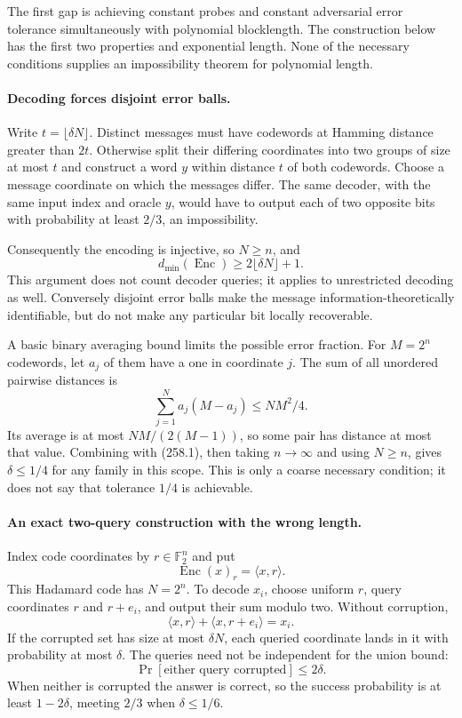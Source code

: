 \documentclass[11pt]{article}
\begin{document}
The first gap is achieving constant probes and constant adversarial error tolerance simultaneously with polynomial blocklength. The construction below has the first two properties and exponential length. None of the necessary conditions supplies an impossibility theorem for polynomial length.

\paragraph{Decoding forces disjoint error balls.}
Write $t=\lfloor\delta N\rfloor$. Distinct messages must have codewords at Hamming distance greater than $2t$. Otherwise split their differing coordinates into two groups of size at most $t$ and construct a word $y$ within distance $t$ of both codewords. Choose a message coordinate on which the messages differ. The same decoder, with the same input index and oracle $y$, would have to output each of two opposite bits with probability at least $2/3$, an impossibility.

Consequently the encoding is injective, so $N\ge n$, and
\[
 d_{\min}(\operatorname{Enc})\ge2\lfloor\delta N\rfloor+1.
 \tag{258.1}
\]
This argument does not count decoder queries; it applies to unrestricted decoding as well. Conversely disjoint error balls make the message information-theoretically identifiable, but do not make any particular bit locally recoverable.

A basic binary averaging bound limits the possible error fraction. For $M=2^n$ codewords, let $a_j$ of them have a one in coordinate $j$. The sum of all unordered pairwise distances is
\[
 \sum_{j=1}^N a_j(M-a_j)\le NM^2/4.
\]
Its average is at most $NM/(2(M-1))$, so some pair has distance at most that value. Combining with (258.1), then taking $n\to\infty$ and using $N\ge n$, gives $\delta\le1/4$ for any family in this scope. This is only a coarse necessary condition; it does not say that tolerance $1/4$ is achievable.

\paragraph{An exact two-query construction with the wrong length.}
Index code coordinates by $r\in\mathbb F_2^n$ and put
\[
 \operatorname{Enc}(x)_r=\langle x,r\rangle.
\]
This Hadamard code has $N=2^n$. To decode $x_i$, choose uniform $r$, query coordinates $r$ and $r+e_i$, and output their sum modulo two. Without corruption,
\[
 \langle x,r\rangle+\langle x,r+e_i\rangle=x_i.
\]
If the corrupted set has size at most $\delta N$, each queried coordinate lands in it with probability at most $\delta$. The queries need not be independent for the union bound:
\[
 \Pr[\text{either query corrupted}]\le2\delta.
\]
When neither is corrupted the answer is correct, so the success probability is at least $1-2\delta$, meeting $2/3$ when $\delta\le1/6$.
\end{document}
